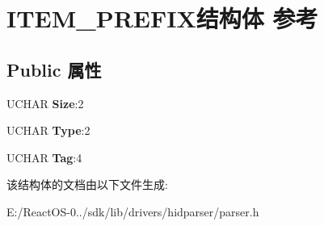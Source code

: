 \hypertarget{struct_i_t_e_m___p_r_e_f_i_x}{}\section{I\+T\+E\+M\+\_\+\+P\+R\+E\+F\+I\+X结构体 参考}
\label{struct_i_t_e_m___p_r_e_f_i_x}
\subsection*{Public 属性}
\begin{DoxyCompactItemize}
\item 
\mbox{\label{struct_i_t_e_m___p_r_e_f_i_x_aae67e263575b2386c615bb2ea2f57858}} 
U\+C\+H\+AR {\bfseries Size}\+:2
\item 
\mbox{\label{struct_i_t_e_m___p_r_e_f_i_x_a6ce2bdfe2b4d1928f82e7772f3a4b0de}} 
U\+C\+H\+AR {\bfseries Type}\+:2
\item 
\mbox{\label{struct_i_t_e_m___p_r_e_f_i_x_a3f6498360d40fbd2e8f22877b2ed700d}} 
U\+C\+H\+AR {\bfseries Tag}\+:4
\end{DoxyCompactItemize}


该结构体的文档由以下文件生成\+:\begin{DoxyCompactItemize}
\item 
E\+:/\+React\+O\+S-\/0../sdk/lib/drivers/hidparser/parser.\+h\end{DoxyCompactItemize}
